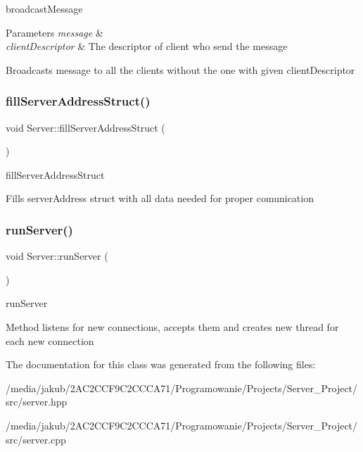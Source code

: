 broadcast\+Message 


\begin{DoxyParams}{Parameters}
{\em message} & \\
\hline
{\em client\+Descriptor} & The descriptor of client who send the message\\
\hline
\end{DoxyParams}
Broadcasts message to all the clients without the one with given client\+Descriptor \mbox{\label{classServer_a684bf0fce1ec62711a60d0cc3d25e8f8}} 
\subsubsection{\texorpdfstring{fill\+Server\+Address\+Struct()}{fillServerAddressStruct()}}
{\footnotesize\ttfamily void Server\+::fill\+Server\+Address\+Struct (\begin{DoxyParamCaption}{ }\end{DoxyParamCaption})\hspace{0.3cm}{\ttfamily [private]}}



fill\+Server\+Address\+Struct 

Fills server\+Address struct with all data needed for proper comunication \mbox{\label{classServer_a5dfdd750d32aa4adbb4fdd8ba29b1224}} 
\subsubsection{\texorpdfstring{run\+Server()}{runServer()}}
{\footnotesize\ttfamily void Server\+::run\+Server (\begin{DoxyParamCaption}{ }\end{DoxyParamCaption})}



run\+Server 

Method listens for new connections, accepts them and creates new thread for each new connection 

The documentation for this class was generated from the following files\+:\begin{DoxyCompactItemize}
\item 
/media/jakub/2\+A\+C2\+C\+C\+F9\+C2\+C\+C\+C\+A71/\+Programowanie/\+Projects/\+Server\+\_\+\+Project/src/server.\+hpp\item 
/media/jakub/2\+A\+C2\+C\+C\+F9\+C2\+C\+C\+C\+A71/\+Programowanie/\+Projects/\+Server\+\_\+\+Project/src/server.\+cpp\end{DoxyCompactItemize}
